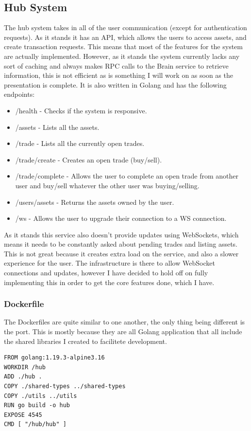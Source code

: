 \documentclass[titlepage]{article}
\begin{document}
\subsection{Hub System}
The hub system takes in all of the user communication (except for authentication requests). As it stands it has an API, which allows the users to access assets, and create transaction requests. This means that most of the features for the system are actually implemented. However, as it stands the system currently lacks any sort of caching and always makes RPC calls to the Brain service to retrieve information, this is not efficient as is something I will work on as soon as the presentation is complete. It is also written in Golang and has the following endpoints:

\begin{itemize}
  \item /health - Checks if the system is responsive.
  \item /assets - Lists all the assets.
  \item /trade - Lists all the currently open trades.
  \item /trade/create - Creates an open trade (buy/sell).
  \item /trade/complete - Allows the user to complete an open trade from another user and buy/sell whatever the other user was buying/selling.
  \item /users/assets - Returns the assets owned by the user.
  \item /ws - Allows the user to upgrade their connection to a WS connection.
\end{itemize}

As it stands this service also doesn't provide updates using WebSockets, which means it needs to be constantly asked about pending trades and listing assets. This is not great because it creates extra load on the service, and also a slower experience for the user. The infrastructure is there to allow WebSocket connections and updates, however I have decided to hold off on fully implementing this in order to get the core features done, which I have.

\subsubsection{Dockerfile}
The Dockerfiles are quite similar to one another, the only thing being different is the port. This is mostly because they are all Golang application that all include the shared libraries I created to facilitete development.
\begin{verbatim}
FROM golang:1.19.3-alpine3.16
WORKDIR /hub
ADD ./hub .
COPY ./shared-types ../shared-types
COPY ./utils ../utils
RUN go build -o hub
EXPOSE 4545
CMD [ "/hub/hub" ]
\end{verbatim}
\end{document}
